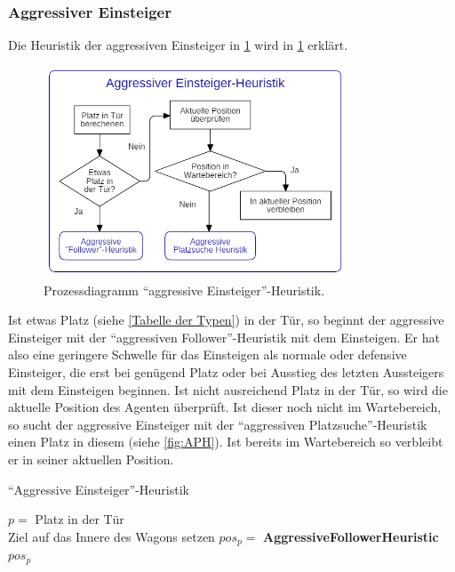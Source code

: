 \subsubsection{Aggressiver Einsteiger}
Die Heuristik der aggressiven Einsteiger in \figurename \ref{fig:AEH} wird in \ref{fig:AEH} erklärt.
\begin{figure}[H]
	\centering
		\includegraphics[width=0.8\textwidth]{pictures/model/algorithm/boarding/aggressive_boarding/aggressive_boarding_heuristic.png}
	\caption{Prozessdiagramm "`aggressive Einsteiger"'-Heuristik.}
	\label{fig:AEH}
\end{figure}
Ist etwas Platz (siehe \ref{Tabelle der Typen}) in der Tür, so beginnt der aggressive Einsteiger mit der "`aggressiven Follower"'-Heuristik mit dem Einsteigen. Er hat also eine geringere Schwelle für das Einsteigen als normale oder defensive Einsteiger, die erst bei genügend Platz oder bei Ausstieg des letzten Aussteigers mit dem Einsteigen beginnen. Ist nicht ausreichend Platz in der Tür, so wird die aktuelle Position des Agenten überprüft. Ist dieser noch nicht im Wartebereich, so sucht der aggressive Einsteiger mit der "`aggressiven Platzsuche"'-Heuristik einen Platz in diesem (siehe \figurename \ref{fig:APH}). Ist bereits im Wartebereich so verbleibt er in seiner aktuellen Position.

\begin{algorithm} [H]
	\caption{"`Aggressive Einsteiger"'-Heuristik}
	
	\AggressiveBoardingHeuristic{} {
		$p=$ Platz in der Tür\\
		 {
			Ziel auf das Innere des Wagons setzen
			$pos_p = $ \textbf{AggressiveFollowerHeuristic}
		} 
		\Return $pos_p$
	}
\end{algorithm}

